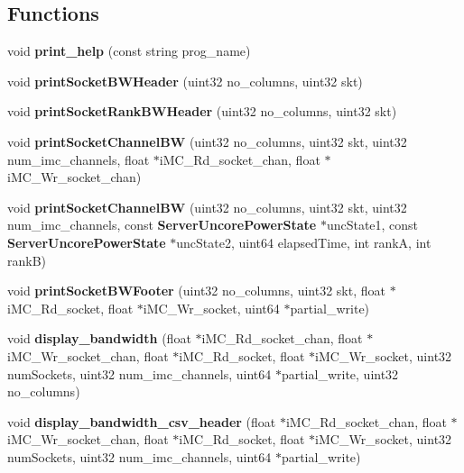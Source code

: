 \subsection*{Functions}
\begin{DoxyCompactItemize}
\item 
void {\bfseries print\+\_\+help} (const string prog\+\_\+name)\label{pcm-memory_8cpp_aed15bac2c898efcc1f005764539f7970}

\item 
void {\bfseries print\+Socket\+B\+W\+Header} (uint32 no\+\_\+columns, uint32 skt)\label{pcm-memory_8cpp_a962949c6d7e9f9fd0e4773274c902e5b}

\item 
void {\bfseries print\+Socket\+Rank\+B\+W\+Header} (uint32 no\+\_\+columns, uint32 skt)\label{pcm-memory_8cpp_a64347d4f792e8aa01f984c6205cfdb23}

\item 
void {\bfseries print\+Socket\+Channel\+BW} (uint32 no\+\_\+columns, uint32 skt, uint32 num\+\_\+imc\+\_\+channels, float $\ast$i\+M\+C\+\_\+\+Rd\+\_\+socket\+\_\+chan, float $\ast$i\+M\+C\+\_\+\+Wr\+\_\+socket\+\_\+chan)\label{pcm-memory_8cpp_afbdee1bec818e0dd79a71becc41f68d2}

\item 
void {\bfseries print\+Socket\+Channel\+BW} (uint32 no\+\_\+columns, uint32 skt, uint32 num\+\_\+imc\+\_\+channels, const {\bf Server\+Uncore\+Power\+State} $\ast$unc\+State1, const {\bf Server\+Uncore\+Power\+State} $\ast$unc\+State2, uint64 elapsed\+Time, int rankA, int rankB)\label{pcm-memory_8cpp_ae714d368c0d95745ce56581cb195e466}

\item 
void {\bfseries print\+Socket\+B\+W\+Footer} (uint32 no\+\_\+columns, uint32 skt, float $\ast$i\+M\+C\+\_\+\+Rd\+\_\+socket, float $\ast$i\+M\+C\+\_\+\+Wr\+\_\+socket, uint64 $\ast$partial\+\_\+write)\label{pcm-memory_8cpp_abbc24d2d54513a1943bd4cf37c829efc}

\item 
void {\bfseries display\+\_\+bandwidth} (float $\ast$i\+M\+C\+\_\+\+Rd\+\_\+socket\+\_\+chan, float $\ast$i\+M\+C\+\_\+\+Wr\+\_\+socket\+\_\+chan, float $\ast$i\+M\+C\+\_\+\+Rd\+\_\+socket, float $\ast$i\+M\+C\+\_\+\+Wr\+\_\+socket, uint32 num\+Sockets, uint32 num\+\_\+imc\+\_\+channels, uint64 $\ast$partial\+\_\+write, uint32 no\+\_\+columns)\label{pcm-memory_8cpp_a3b836715e66a76d0276bc6c53c155031}

\item 
void {\bfseries display\+\_\+bandwidth\+\_\+csv\+\_\+header} (float $\ast$i\+M\+C\+\_\+\+Rd\+\_\+socket\+\_\+chan, float $\ast$i\+M\+C\+\_\+\+Wr\+\_\+socket\+\_\+chan, float $\ast$i\+M\+C\+\_\+\+Rd\+\_\+socket, float $\ast$i\+M\+C\+\_\+\+Wr\+\_\+socket, uint32 num\+Sockets, uint32 num\+\_\+imc\+\_\+channels, uint64 $\ast$partial\+\_\+write)\label{pcm-memory_8cpp_aef2c828b337ba7e39a88ae128da716dc}


\end{DoxyCompactItemize}
